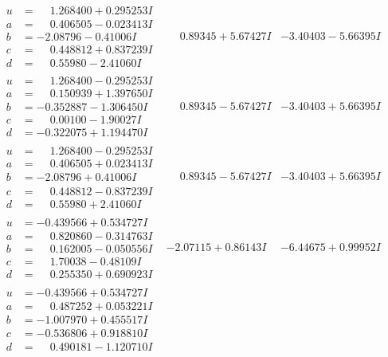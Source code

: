 \documentclass[1p]{elsarticle_modified}
\theoremstyle{definition}
\begin{document}
$$\begin{array}{c|c|c}
\begin{aligned}
u &= \phantom{-}1.268400 + 0.295253 I \\
a &= \phantom{-}0.406505 - 0.023413 I \\
b &= -2.08796 - 0.41006 I \\
c &= \phantom{-}0.448812 + 0.837239 I \\
d &= \phantom{-}0.55980 - 2.41060 I\end{aligned}
 & \phantom{-}0.89345 + 5.67427 I & -3.40403 - 5.66395 I \\ \hline\begin{aligned}
u &= \phantom{-}1.268400 - 0.295253 I \\
a &= \phantom{-}0.150939 + 1.397650 I \\
b &= -0.352887 - 1.306450 I \\
c &= \phantom{-}0.00100 - 1.90027 I \\
d &= -0.322075 + 1.194470 I\end{aligned}
 & \phantom{-}0.89345 - 5.67427 I & -3.40403 + 5.66395 I \\ \hline\begin{aligned}
u &= \phantom{-}1.268400 - 0.295253 I \\
a &= \phantom{-}0.406505 + 0.023413 I \\
b &= -2.08796 + 0.41006 I \\
c &= \phantom{-}0.448812 - 0.837239 I \\
d &= \phantom{-}0.55980 + 2.41060 I\end{aligned}
 & \phantom{-}0.89345 - 5.67427 I & -3.40403 + 5.66395 I \\ \hline\begin{aligned}
u &= -0.439566 + 0.534727 I \\
a &= \phantom{-}0.820860 - 0.314763 I \\
b &= \phantom{-}0.162005 - 0.050556 I \\
c &= \phantom{-}1.70038 - 0.48109 I \\
d &= \phantom{-}0.255350 + 0.690923 I\end{aligned}
 & -2.07115 + 0.86143 I & -6.44675 + 0.99952 I \\ \hline\begin{aligned}
u &= -0.439566 + 0.534727 I \\
a &= \phantom{-}0.487252 + 0.053221 I \\
b &= -1.007970 + 0.455517 I \\
c &= -0.536806 + 0.918810 I \\
d &= \phantom{-}0.490181 - 1.120710 I\end{aligned}

\end{array}$$
\end{document}
